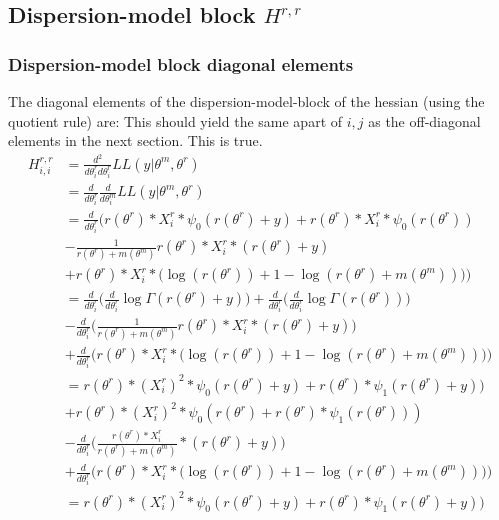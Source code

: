 \documentclass[bibliography=totoc,10pt]{scrartcl}
\begin{document}
\subsection{Dispersion-model block $H^{r,r}$}
\subsubsection{Dispersion-model block diagonal elements}
The diagonal elements of the dispersion-model-block of the hessian (using the quotient rule) are:
This should yield the same apart of $i,j$ as the off-diagonal elements in the next section. This is true.
\begin{equation}
\begin{split}
H^{r,r}_{i,i} &= \frac{d^2}{d \theta^r_i d \theta^r_i} LL(y|\theta^m, \theta^r) \\
&= \frac{d}{d \theta^r_i} \frac{d}{d \theta^m_i} LL(y|\theta^m, \theta^r) \\
&= \frac{d}{d \theta^r_i} \bigg(   r(\theta^r) * X^r_{i} * \psi_0(r(\theta^r)+y)+ r(\theta^r) * X^r_{i} * \psi_0(r(\theta^r)) \\
&- \frac{1}{r(\theta^r)+m(\theta^m)} r(\theta^r) * X^r_{i}  *(r(\theta^r) + y) \\
&+ r(\theta^r) * X^r_{i}  * \bigg( \log(r(\theta^r)) + 1 - \log(r(\theta^r)+m(\theta^m)) \bigg)  \bigg) \\
&= \frac{d}{d \theta^r_i} \bigg(  \frac{d}{d \theta^r_i} \log \Gamma(r(\theta^r)+y) \bigg) + \frac{d}{d \theta^r_i} \bigg( \frac{d}{d \theta^r_i} \log \Gamma(r(\theta^r)) \bigg) \\
&- \frac{d}{d \theta^r_i} \bigg(  \frac{1}{r(\theta^r)+m(\theta^m)} r(\theta^r) * X^r_{i}  *(r(\theta^r) + y) \bigg) \\
&+ \frac{d}{d \theta^r_i} \bigg( r(\theta^r) * X^r_{i}  * \bigg( \log(r(\theta^r)) + 1 - \log(r(\theta^r)+m(\theta^m)) \bigg)  \bigg) \\
&= r(\theta^r) * (X^r_{i})^2 * \psi_0(r(\theta^r)+y) +  r(\theta^r) *  \psi_1(r(\theta^r)+y) ) \\
&+ r(\theta^r) * (X^r_{i})^2 * \psi_0(r(\theta^r) +  r(\theta^r) *  \psi_1(r(\theta^r)) ) \\
&- \frac{d}{d \theta^r_i} \bigg(  \frac{r(\theta^r) * X^r_{i} }{r(\theta^r)+m(\theta^m)} *(r(\theta^r) + y) \bigg) \\
&+ \frac{d}{d \theta^r_i} \bigg( r(\theta^r) * X^r_{i}  * \bigg( \log(r(\theta^r)) + 1 - \log(r(\theta^r)+m(\theta^m)) \bigg)  \bigg) \\
&= r(\theta^r) * (X^r_{i})^2 * \psi_0(r(\theta^r)+y) +  r(\theta^r) *  \psi_1(r(\theta^r)+y) ) \\

\end{split}
\end{equation}
\end{document}
